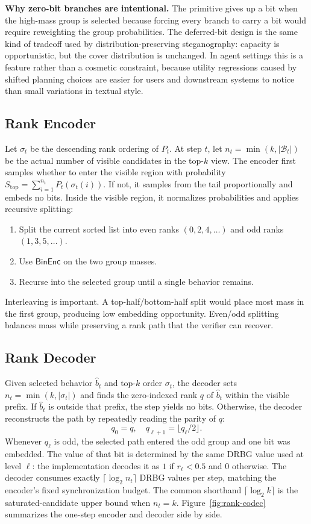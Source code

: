 \documentclass[conference,compsoc]{IEEEtran}
\newcommand{\BinEnc}{\ensuremath{\mathsf{BinEnc}}}
\newcommand{\B}{\mathcal{B}}
\begin{document}
\textbf{Why zero-bit branches are intentional.}
The primitive gives up a bit when the high-mass group is selected because forcing every branch to carry a bit would require reweighting the group probabilities. The deferred-bit design is the same kind of tradeoff used by distribution-preserving steganography: capacity is opportunistic, but the cover distribution is unchanged. In agent settings this is a feature rather than a cosmetic constraint, because utility regressions caused by shifted planning choices are easier for users and downstream systems to notice than small variations in textual style.

\subsection{Rank Encoder}

Let $\sigma_t$ be the descending rank ordering of $P_t$. At step $t$, let $n_t=\min(k,|\B_t|)$ be the actual number of visible candidates in the top-$k$ view. The encoder first samples whether to enter the visible region with probability $S_{\mathrm{top}}=\sum_{i=1}^{n_t}P_t(\sigma_t(i))$. If not, it samples from the tail proportionally and embeds no bits. Inside the visible region, it normalizes probabilities and applies recursive splitting:
\begin{enumerate}[leftmargin=*]
  \item Split the current sorted list into even ranks $(0,2,4,\ldots)$ and odd ranks $(1,3,5,\ldots)$.
  \item Use \BinEnc{} on the two group masses.
  \item Recurse into the selected group until a single behavior remains.
\end{enumerate}
Interleaving is important. A top-half/bottom-half split would place most mass in the first group, producing low embedding opportunity. Even/odd splitting balances mass while preserving a rank path that the verifier can recover.

\subsection{Rank Decoder}

Given selected behavior $\hat b_t$ and top-$k$ order $\sigma_t$, the decoder sets $n_t=\min(k,|\sigma_t|)$ and finds the zero-indexed rank $q$ of $\hat b_t$ within the visible prefix. If $\hat b_t$ is outside that prefix, the step yields no bits. Otherwise, the decoder reconstructs the path by repeatedly reading the parity of $q$:
\begin{equation}
  q_0=q,\quad q_{\ell+1}=\lfloor q_{\ell}/2\rfloor.
\end{equation}
Whenever $q_\ell$ is odd, the selected path entered the odd group and one bit was embedded. The value of that bit is determined by the same DRBG value used at level $\ell$: the implementation decodes it as $1$ if $r_\ell<0.5$ and $0$ otherwise. The decoder consumes exactly $\lceil\log_2 n_t\rceil$ DRBG values per step, matching the encoder's fixed synchronization budget. The common shorthand $\lceil\log_2 k\rceil$ is the saturated-candidate upper bound when $n_t=k$. Figure~\ref{fig:rank-codec} summarizes the one-step encoder and decoder side by side.
\end{document}
